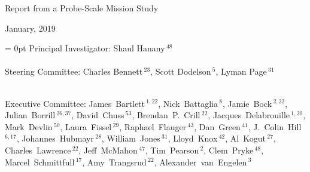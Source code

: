 \documentclass[PICOReport.tex]{subfiles}
\begin{document}
%
%
%
%
\Large{ \centerline{Report from a Probe-Scale Mission Study}}
\large{ \centerline{January, 2019 }}

\parindent = 0pt
\small{
Principal Investigator: Shaul Hanany\,$^{48}$ } \\
\vspace{-9pt} \\
\small{
Steering Committee: Charles Bennett\,$^{23}$, Scott Dodelson\,$^{5}$, Lyman Page\,$^{31}$ } \\
\vspace{-9pt} \\
\small{
\raggedright
Executive Committee:
James~Bartlett\,$^{1,22}$,
Nick~Battaglia\,$^{8}$,
Jamie~Bock\,$^{2,22}$,
Julian~Borrill\,$^{26,37}$,
David~Chuss\,$^{53}$,
Brendan~P.~Crill\,$^{22}$,
Jacques~Delabrouille\,$^{1,20}$,
Mark~Devlin\,$^{50}$,
Laura~Fissel\,$^{29}$,
Raphael~Flauger\,$^{43}$,
Dan~Green\,$^{41}$,
J.~Colin~Hill\,$^{6,17}$,
Johannes~Hubmayr\,$^{28}$,
William~Jones\,$^{31}$,
Lloyd~Knox\,$^{42}$,
Al~Kogut\,$^{27}$,
Charles~Lawrence\,$^{22}$,
Jeff~McMahon\,$^{47}$,
Tim~Pearson\,$^{2}$,
Clem~Pryke\,$^{48}$,
Marcel~Schmittfull\,$^{17}$,
Amy~Trangsrud\,$^{22}$,
Alexander~van~Engelen\,$^3$ \\
}

\label{authorlist}
\end{document}
